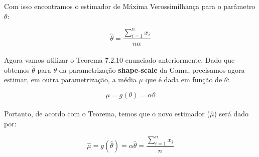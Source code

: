 
Com isso encontramos o estimador de Máxima Verossimilhança para o parâmetro $\theta$:

\begin{equation}
 \widehat{\theta} = \frac{\sum_{i=1}^{n}x_i}{n\alpha} 
\end{equation}\\

Agora vamos utilizar o Teorema 7.2.10 enunciado anteriormente. Dado que obtemos $\widehat{\theta}$ para $\theta$ da parametrização \textbf{shape-scale} da Gama, precisamos agora estimar, em outra parametrização, a média $\mu$ que é dada em função de $\theta$:

\begin{equation}
\mu = g(\theta) = \alpha\theta
\end{equation}\\

Portanto, de acordo com o Teorema, temos que o novo estimador ($\widehat{\mu}$) será dado por:

\begin{equation}
\widehat{\mu} = g(\widehat{\theta}) = \alpha\widehat{\theta}=  \frac{\sum_{i=1}^{n}x_i}{n}
\end{equation}






